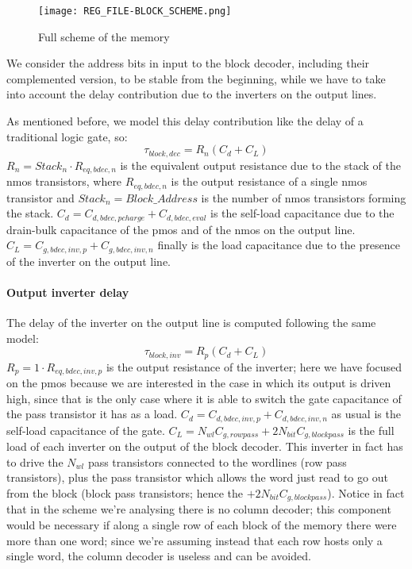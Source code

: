 \begin{center}
	\begin{figure}[H]
		\centering
		\texttt{[image: REG\_FILE-BLOCK\_SCHEME.png]}
		\caption{Full scheme of the memory}
		\label{block_scheme}
	\end{figure}
\end{center}

We consider the address bits in input to the block decoder, including their complemented version, to be stable from the beginning, while we have to take into account the delay contribution due to the inverters on the output lines. 

As mentioned before, we model this delay contribution like the delay of a traditional logic gate, so:
$$\tau_{block,dec}=R_n(C_d+C_L)$$
$R_n=Stack_n\cdot R_{eq,bdec,n}$ is the equivalent output resistance due to the stack of the nmos transistors, where $R_{eq,bdec,n}$ is the output resistance of a single nmos transistor and $Stack_n=Block\_Address$ is the number of nmos transistors forming the stack. $C_d=C_{d,bdec,pcharge}+C_{d,bdec,eval}$ is the self-load capacitance due to the drain-bulk capacitance of the pmos and of the nmos on the output line. $C_L=C_{g,bdec,inv,p}+C_{g,bdec,inv,n}$ finally is the load capacitance due to the presence of the inverter on the output line. 

\paragraph{Output inverter delay}
The delay of the inverter on the output line is computed following the same model: 
$$\tau_{block,inv}=R_p(C_d+C_L)$$
$R_p=1\cdot R_{eq,bdec,inv,p}$ is the output resistance of the inverter; here we have focused on the pmos because we are interested in the case in which its output is driven high, since that is the only case where it is able to switch the gate capacitance of the pass transistor it has as a load. $C_d=C_{d,bdec,inv,p}+C_{d,bdec,inv,n}$ as usual is the self-load capacitance of the gate. $C_L=N_{wl}C_{g,rowpass}+2N_{bit}C_{g,blockpass}$ is the full load of each inverter on the output of the block decoder. This inverter in fact has to drive the $N_{wl}$ pass transistors connected to the wordlines (row pass transistors), plus the pass transistor which allows the word just read to go out from the block (block pass transistors; hence the $+2N_{bit}C_{g,blockpass}$). Notice in fact that in the scheme we're analysing there is no column decoder; this component would be necessary if along a single row of each block of the memory there were more than one word; since we're assuming instead that each row hosts only a single word, the column decoder is useless and can be avoided. 

